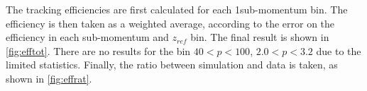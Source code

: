 
  
    

The tracking efficiencies are first calculated for each 1\gevc sub-momentum bin. The efficiency is then taken as a weighted average, according to the error on the efficiency in each sub-momentum and $z_{ref}$ bin. The final result is shown in \autoref{fig:efftot}. There are no results for the bin $40<p<100$\gevc, $2.0<p<3.2$ due to the limited statistics. Finally, the ratio between simulation and data is taken, as shown in \autoref{fig:effrat}.


